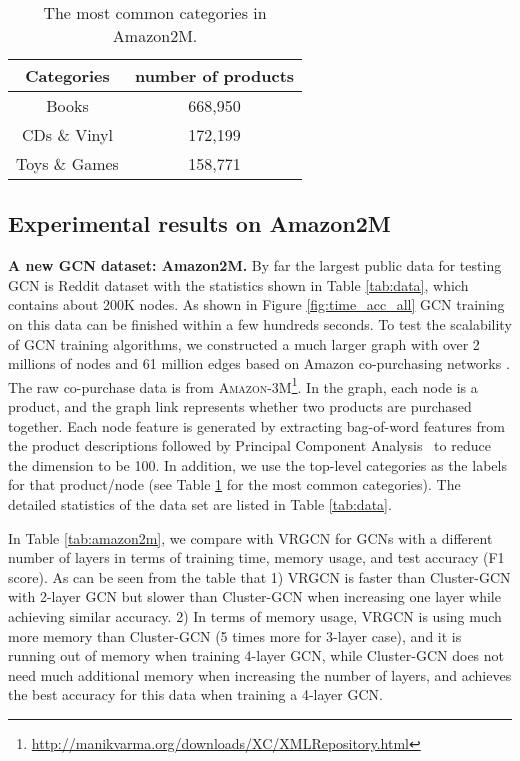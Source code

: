 \documentclass[sigconf]{acmart}
\begin{document}
\begin{table}
\caption{The most common categories in Amazon2M.}
  \centering
  \renewcommand\bfdefault{b}
  \vspace{-10pt}\begin{tabular}{|c|c|}
  \hline
  Categories & number of products\\
  \hline
  Books & 668,950\\
  \hline
  CDs \& Vinyl & 172,199\\
  \hline
  Toys \& Games & 158,771\\
\hline
\end{tabular}
\label{tab:category}
\vspace{-10pt}
\end{table}

\subsection{Experimental results on Amazon2M}
\label{sec:amazon}
{\bf A new GCN dataset: Amazon2M.}
By far the largest public data for testing GCN is Reddit dataset with the statistics shown in Table \ref{tab:data}, which contains about 200K nodes. As shown in Figure \ref{fig:time_acc_all} GCN training on this data can be finished within a few hundreds seconds.
To test the scalability of GCN training algorithms, we constructed a much larger graph with over 2 millions of nodes and 61 million edges based on Amazon co-purchasing networks \citep{mcauley2015image,mcauley2015inferring}.  The raw co-purchase data is from \textsc{Amazon-3M}\footnote{\url{http://manikvarma.org/downloads/XC/XMLRepository.html}}. In the graph, each node is a product, and the graph link represents whether two products are purchased together. Each node feature is generated by extracting bag-of-word features from the product descriptions followed by Principal Component Analysis~\cite{PCA} to reduce the dimension to be 100. In addition, we use the top-level categories as the labels for that product/node (see Table \ref{tab:category} for the most common categories). The detailed statistics of the data set are listed in Table \ref{tab:data}.

In Table \ref{tab:amazon2m}, we compare with VRGCN for GCNs with a different number of layers in terms of training time, memory usage, and test accuracy (F1 score). As can be seen from the table that 1) VRGCN is faster than Cluster-GCN with 2-layer GCN but slower than Cluster-GCN when increasing one layer while achieving similar accuracy. 2) In terms of memory usage, VRGCN is using much more memory than Cluster-GCN (5 times more for 3-layer case), and it is running out of memory when training 4-layer GCN, while Cluster-GCN does not need much additional memory when increasing the number of layers, and achieves the best accuracy for this data when training a 4-layer GCN. 
\end{document}
